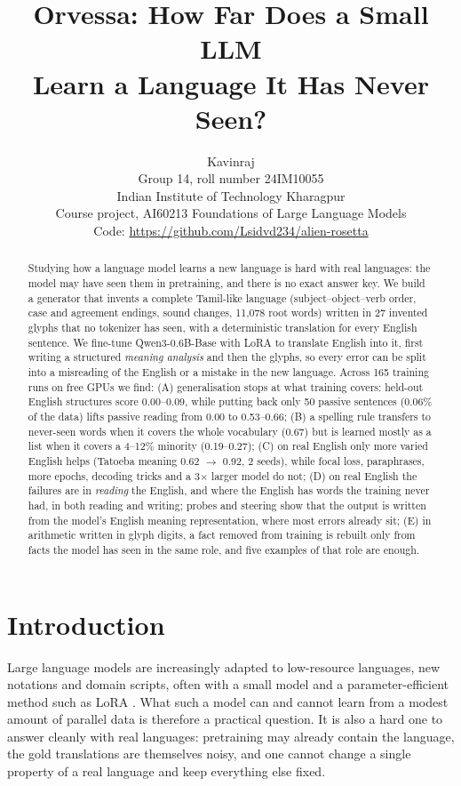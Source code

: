 \documentclass{article} %
\title{Orvessa: How Far Does a Small LLM\\ Learn a Language It Has Never Seen?}
\author{Kavinraj \\
Group 14, roll number 24IM10055 \\
Indian Institute of Technology Kharagpur \\
Course project, AI60213 Foundations of Large Language Models \\
Code: \url{https://github.com/Lsidvd234/alien-rosetta}
}
\begin{document}
\maketitle
\lhead{}\renewcommand{\headrulewidth}{0pt}

\begin{abstract}
Studying how a language model learns a new language is hard with real languages: the model may have seen them in
pretraining, and there is no exact answer key. We build a generator that invents a complete Tamil-like language
(subject--object--verb order, case and agreement endings, sound changes, 11,078 root words) written in 27 invented
glyphs that no tokenizer has seen, with a deterministic translation for every English sentence. We fine-tune
Qwen3-0.6B-Base with LoRA to translate English into it, first writing a structured \emph{meaning analysis} and then
the glyphs, so every error can be split into a misreading of the English or a mistake in the new language. Across
165 training runs on free GPUs we find: (A) generalisation stops at what training covers: held-out English
structures score 0.00--0.09, while putting back only 50 passive sentences (0.06\% of the data) lifts passive
reading from 0.00 to 0.53--0.66; (B) a spelling rule transfers to never-seen words when it covers the whole vocabulary
(0.67) but is learned mostly as a list when it covers a 4--12\% minority (0.19--0.27); (C) on real English only more
varied English helps (Tatoeba meaning 0.62 $\rightarrow$ 0.92, 2 seeds), while focal loss, paraphrases, more epochs,
decoding tricks and a 3$\times$ larger model do not; (D) on real English the failures are in \emph{reading} the
English, and where the English has words the training never had, in both reading and writing; probes and steering
show that the output is written from the model's English meaning representation, where most errors already sit;
(E) in arithmetic written in glyph digits, a fact removed from training is rebuilt only from facts the model has seen
in the same role, and five examples of that role are enough.
\end{abstract}

\section{Introduction}

Large language models are increasingly adapted to low-resource languages, new notations and domain scripts, often
with a small model and a parameter-efficient method such as LoRA \citep{hu2022lora}. What such a model can and cannot
learn from a modest amount of parallel data is therefore a practical question. It is also a hard one to answer
cleanly with real languages: pretraining may already contain the language, the gold translations are themselves
noisy, and one cannot change a single property of a real language and keep everything else fixed.
\end{document}
